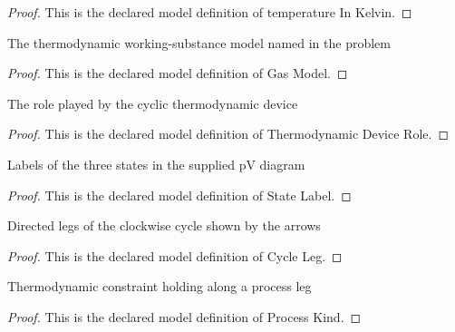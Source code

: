 \begin{proof}
  This is the declared model definition of temperature In Kelvin.
\end{proof}
\begin{definition}
  \label{def:physics:phyx-mini-0350:phyxminiproblems-problemphyxmini0350-gasmodel}
  The thermodynamic working-substance model named in the problem
\end{definition}
\begin{proof}
  This is the declared model definition of Gas Model.
\end{proof}
\begin{definition}
  \label{def:physics:phyx-mini-0350:phyxminiproblems-problemphyxmini0350-thermodynamicdevicerole}
  The role played by the cyclic thermodynamic device
\end{definition}
\begin{proof}
  This is the declared model definition of Thermodynamic Device Role.
\end{proof}
\begin{definition}
  \label{def:physics:phyx-mini-0350:phyxminiproblems-problemphyxmini0350-statelabel}
  Labels of the three states in the supplied pV diagram
\end{definition}
\begin{proof}
  This is the declared model definition of State Label.
\end{proof}
\begin{definition}
  \label{def:physics:phyx-mini-0350:phyxminiproblems-problemphyxmini0350-cycleleg}
  Directed legs of the clockwise cycle shown by the arrows
\end{definition}
\begin{proof}
  This is the declared model definition of Cycle Leg.
\end{proof}
\begin{definition}
  \label{def:physics:phyx-mini-0350:phyxminiproblems-problemphyxmini0350-processkind}
  Thermodynamic constraint holding along a process leg
\end{definition}
\begin{proof}
  This is the declared model definition of Process Kind.
\end{proof}
